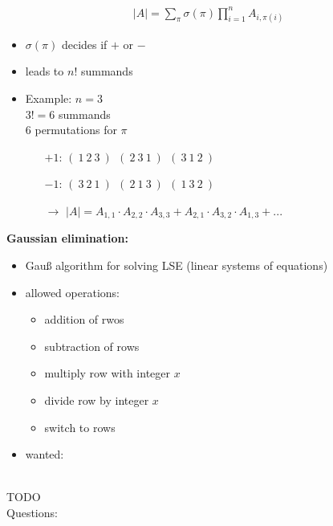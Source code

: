 \documentclass[a4]{scrartcl}
\begin{document}
\begin{align*}
\\
|A| = \sum_{\pi} \sigma(\pi) \prod^{n}_{i=1} A_{i, \pi(i)}
\end{align*}
\begin{itemize}
\item $\sigma(\pi)$ decides if $+$ or $-$
\item leads to $n!$ summands
\item Example: $n= 3$ \\
$3! = 6$ summands \\
$6$ permutations for $\pi$ 
\begin{itemize}
\item[$+1$: ] $( \ 1 \ 2 \ 3 \ ) \ \ ( \ 2 \ 3 \ 1 \ ) \ \  ( \ 3 \ 1 \ 2 \ ) $
\item[$-1$: ] $( \ 3 \ 2 \ 1 \ ) \ \ ( \ 2 \ 1 \ 3 \ ) \ \  ( \ 1 \ 3 \ 2 \ ) $
\item[$\rightarrow$] $|A| = A_{1,1} \cdot A_{2,2} \cdot A_{3,3} + A_{2,1} \cdot A_{3,2} \cdot A_{1,3} + ...$
\end{itemize}
\end{itemize}



\textbf{Gaussian elimination:}
\begin{itemize}
\item Gauß algorithm for solving LSE (linear systems of equations)
\item allowed operations:
\begin{itemize}
\item addition of rwos
\item subtraction of rows
\item multiply row with integer $x$
\item divide row by integer $x$
\item switch to rows
\end{itemize}
\item wanted: 
\end{itemize}










\ \\

\color{red} TODO \\
\color{black}
\color{violet} Questions: \\
\color{black}
\end{document}
